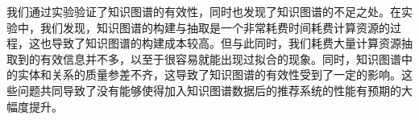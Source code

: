 \documentclass{ctexart}
\begin{document}
\begin{sloppypar}
    我们通过实验验证了知识图谱的有效性，同时也发现了知识图谱的不足之处。在实验中，我们发现，知识图谱的构建与抽取是一个非常耗费时间耗费计算资源的过程，这也导致了知识图谱的构建成本较高。但与此同时，我们耗费大量计算资源抽取到的有效信息并不多，以至于很容易就能出现过拟合的现象。同时，知识图谱中的实体和关系的质量参差不齐，这导致了知识图谱的有效性受到了一定的影响。这些问题共同导致了没有能够使得加入知识图谱数据后的推荐系统的性能有预期的大幅度提升。


\end{sloppypar}
\end{document}
